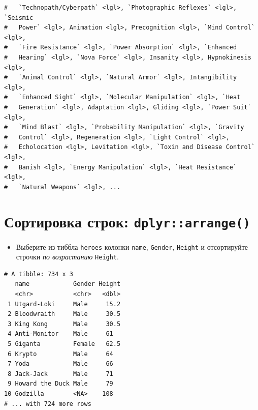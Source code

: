 \documentclass[
]{book}
\newenvironment{Shaded}{\begin{snugshade}}{\end{snugshade}}
\newcommand{\KeywordTok}[1]{\textcolor[rgb]{0.13,0.29,0.53}{\textbf{#1}}}
\newcommand{\NormalTok}[1]{#1}
\newcommand{\OperatorTok}[1]{\textcolor[rgb]{0.81,0.36,0.00}{\textbf{#1}}}
\newcommand{\StringTok}[1]{\textcolor[rgb]{0.31,0.60,0.02}{#1}}
\providecommand{\tightlist}{%
  \setlength{\itemsep}{0pt}\setlength{\parskip}{0pt}}
\begin{document}
\begin{verbatim}
#   `Technopath/Cyberpath` <lgl>, `Photographic Reflexes` <lgl>, `Seismic
#   Power` <lgl>, Animation <lgl>, Precognition <lgl>, `Mind Control` <lgl>,
#   `Fire Resistance` <lgl>, `Power Absorption` <lgl>, `Enhanced
#   Hearing` <lgl>, `Nova Force` <lgl>, Insanity <lgl>, Hypnokinesis <lgl>,
#   `Animal Control` <lgl>, `Natural Armor` <lgl>, Intangibility <lgl>,
#   `Enhanced Sight` <lgl>, `Molecular Manipulation` <lgl>, `Heat
#   Generation` <lgl>, Adaptation <lgl>, Gliding <lgl>, `Power Suit` <lgl>,
#   `Mind Blast` <lgl>, `Probability Manipulation` <lgl>, `Gravity
#   Control` <lgl>, Regeneration <lgl>, `Light Control` <lgl>,
#   Echolocation <lgl>, Levitation <lgl>, `Toxin and Disease Control` <lgl>,
#   Banish <lgl>, `Energy Manipulation` <lgl>, `Heat Resistance` <lgl>,
#   `Natural Weapons` <lgl>, ...
\end{verbatim}

\hypertarget{solution_arr}{%
\section{\texorpdfstring{Сортировка строк: \texttt{dplyr::arrange()}}{Сортировка строк: dplyr::arrange()}}\label{solution_arr}}

\begin{itemize}
\tightlist
\item
  Выберите из тиббла \texttt{heroes} колонки \texttt{name}, \texttt{Gender}, \texttt{Height} и отсортируйте строчки \emph{по возрастанию} \texttt{Height}.
\end{itemize}

\begin{Shaded}
\end{Shaded}

\begin{verbatim}
# A tibble: 734 x 3
   name            Gender Height
   <chr>           <chr>   <dbl>
 1 Utgard-Loki     Male     15.2
 2 Bloodwraith     Male     30.5
 3 King Kong       Male     30.5
 4 Anti-Monitor    Male     61  
 5 Giganta         Female   62.5
 6 Krypto          Male     64  
 7 Yoda            Male     66  
 8 Jack-Jack       Male     71  
 9 Howard the Duck Male     79  
10 Godzilla        <NA>    108  
# ... with 724 more rows
\end{verbatim}
\end{document}
